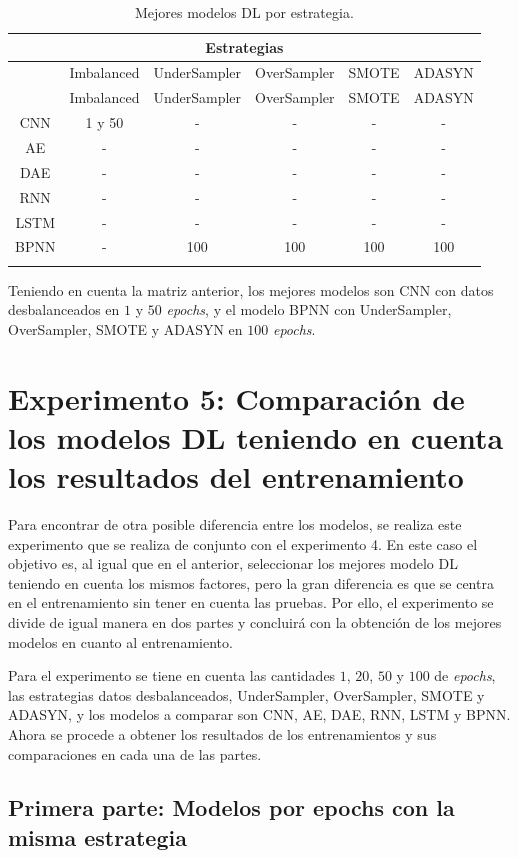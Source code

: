 \begin{longtable}{|c|c|c|c|c|c|}
	\hline
	\multicolumn{6}{|c|}{Estrategias}\\ \hline
	\space & Imbalanced & UnderSampler & OverSampler & SMOTE & ADASYN\\ \hline
	\endfirsthead
	\hline
	\space & Imbalanced & UnderSampler & OverSampler & SMOTE & ADASYN\\ \hline
	\endhead
	CNN & 1 y 50 & - & - & - & -\\ \hline
	AE & - & - & - & - & -\\ \hline
	DAE & - & - & - & - & -\\ \hline
	RNN & - & - & - & - & -\\ \hline
	LSTM & - & - & - & - & -\\ \hline
	BPNN & - & 100 & 100 & 100 & 100\\ \hline
	\caption{Mejores modelos DL por estrategia.}
	\label{t:11}
\end{longtable}

  Teniendo en cuenta la matriz anterior, los mejores modelos son CNN con datos desbalanceados en $1$ y $50$ \textit{epochs}, y el modelo BPNN con UnderSampler, OverSampler, SMOTE y ADASYN en $100$ \textit{epochs}.
  
  \section{Experimento 5: Comparaci\'{o}n de los modelos DL teniendo en cuenta los resultados del entrenamiento}

  Para encontrar de otra posible diferencia entre los modelos, se realiza este experimento que se realiza de conjunto con el experimento 4. En este caso el objetivo es, al igual que en el anterior, seleccionar los mejores modelo DL teniendo en cuenta los mismos factores, pero la gran diferencia es que se centra en el entrenamiento sin tener en cuenta las pruebas. Por ello, el experimento se divide de igual manera en dos partes y concluir\'{a} con la obtenci\'{o}n de los mejores modelos en cuanto al entrenamiento.
  
  Para el experimento se tiene en cuenta las cantidades $1$, $20$, $50$ y $100$ de \textit{epochs}, las estrategias datos desbalanceados, UnderSampler, OverSampler, SMOTE y ADASYN, y los modelos a comparar son CNN, AE, DAE, RNN, LSTM y BPNN. Ahora se procede a obtener los resultados de los entrenamientos y sus comparaciones en cada una de las partes.
  
  \subsection{Primera parte: Modelos por epochs con la misma estrategia}

